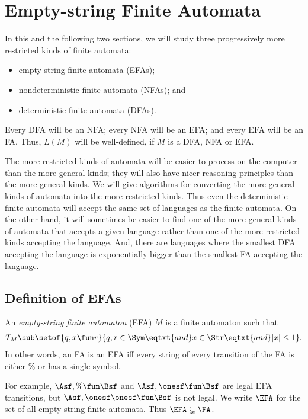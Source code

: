 \section{Empty-string Finite Automata}
\label{EmptyStringFiniteAutomata}

In this and the following two sections, we will study three
progressively more restricted kinds of finite automata:
\begin{itemize}
\item empty-string finite automata (EFAs);

\item nondeterministic finite automata (NFAs); and

\item deterministic finite automata (DFAs).
\end{itemize}
Every DFA will be an NFA; every NFA will be an EFA; and every EFA will
be an FA.  Thus, $L(M)$ will be well-defined, if $M$ is a DFA, NFA or
EFA.

The more restricted kinds of automata will be easier to process on the
computer than the more general kinds; they will also have nicer
reasoning principles than the more general kinds.  We will give
algorithms for converting the more general kinds of automata into the
more restricted kinds.  Thus even the deterministic finite automata
will accept the same set of languages as the finite automata.  On the
other hand, it will sometimes be easier to find one of the more
general kinds of automata that accepts a given language rather than
one of the more restricted kinds accepting the language.  And, there
are languages where the smallest DFA accepting the language is
exponentially bigger than the smallest FA accepting the language.

\subsection{Definition of EFAs}

An \emph{empty-string finite automaton} (EFA) $M$ is
a finite automaton such that
\begin{gather*}
T_M\sub\setof{q, x\fun r}{q,r\in\Sym\eqtxt{and}x\in\Str\eqtxt{and}|x|\leq 1}.
\end{gather*}
In other words, an FA is an EFA iff every string of every transition
of the FA is either $\%$ or has a single symbol.

For example, $\Asf,\%\fun\Bsf$ and $\Asf,\onesf\fun\Bsf$ are legal EFA
transitions, but $\Asf,\onesf\onesf\fun\Bsf$ is not legal.  We write
$\EFA$ for the set of all empty-string finite automata.  Thus
$\EFA\subsetneq\FA$.

